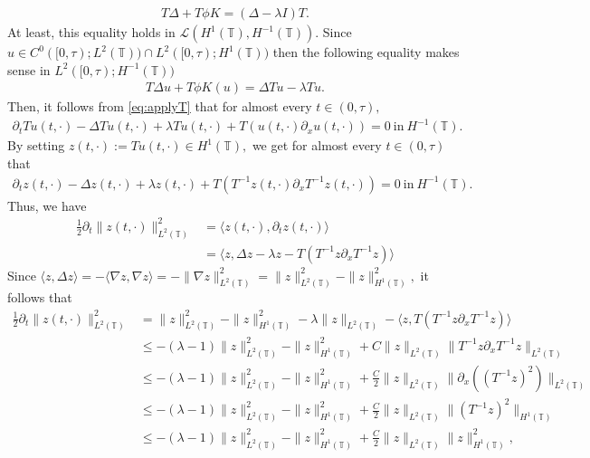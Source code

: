 \documentclass[11pt, dvipsnames]{amsart}
\begin{document}
\begin{align*}
    T\Delta +T\phi K=(\Delta-\lambda I)T.
\end{align*} 
At least, this equality holds in $\mathcal{L}(H^{1}(\mathbb{T}), H^{-1}(\mathbb{T})).$ Since $u\in C^0([0,\tau); L^2(\mathbb{T}))\cap L^{2}([0,\tau);H^{1}(\mathbb{T}))$ 
then the following equality makes sense in $L^{2}([0,\tau);H^{-1}(\mathbb{T}))$
\begin{align*}
    T\Delta u+T\phi K(u)=\Delta Tu -\lambda Tu.
\end{align*} Then, it follows from \eqref{eq:applyT} that for almost every $t\in (0,\tau),$
\begin{align*}
    \partial_t Tu(t,\cdot)-\Delta Tu(t,\cdot) +\lambda Tu(t,\cdot)+T(u(t,\cdot)\partial_x u(t,\cdot))=0\ \text{in}\  H^{-1}(\mathbb{T}).
\end{align*} By setting $z(t,\cdot):=Tu(t,\cdot)\in H^1(\mathbb{T}),$ we get for almost every $t\in (0,\tau)$ that
\begin{align*}
    \partial_t z(t,\cdot)-\Delta z(t,\cdot) +\lambda z(t,\cdot)+T(T^{-1}z(t,\cdot)\partial_x T^{-1}z(t,\cdot))=0\ \text{in}\  H^{-1}(\mathbb{T}).
\end{align*}
Thus, we have
\begin{align*}
    \frac{1}{2}\partial_t \|z(t,\cdot)\|^2_{L^2(\mathbb{T})}&=\langle z(t, \cdot), \partial_t z(t,\cdot)\rangle\\
    &=\langle z, \Delta z -\lambda z-T(T^{-1}z\partial_x T^{-1}z)\rangle
\end{align*}
Since $\langle z, \Delta z\rangle=-\langle \nabla z, \nabla z\rangle=-\|\nabla z\|^2_{L^2(\mathbb{T})}=\|z\|^2_{L^2(\mathbb{T})}-\|z\|^2_{H^1(\mathbb{T})},$ it follows that
\begin{align*}
\frac{1}{2}\partial_t \|z(t,\cdot)\|^2_{L^2(\mathbb{T})}&= \|z\|^2_{L^2(\mathbb{T})}-\|z\|^2_{H^1(\mathbb{T})}-\lambda\|z\|_{L^2(\mathbb{T})}-\langle z, T(T^{-1}z\partial_x T^{-1}z)\rangle   \\
&\leq -(\lambda-1)\|z\|^2_{L^2(\mathbb{T})}-\|z\|^2_{H^1(\mathbb{T})}+C\|z\|_{L^2(\mathbb{T})}\|T^{-1}z\partial_x T^{-1}z\|_{L^2(\mathbb{T})}\\
& \leq -(\lambda-1)\|z\|^2_{L^2(\mathbb{T})}-\|z\|^2_{H^1(\mathbb{T})}+\frac{C}{2}\|z\|_{L^2(\mathbb{T})}\|\partial_x ((T^{-1}z)^2)\|_{L^2(\mathbb{T})}\\
&\leq -(\lambda-1)\|z\|^2_{L^2(\mathbb{T})}-\|z\|^2_{H^1(\mathbb{T})}+\frac{C}{2}\|z\|_{L^2(\mathbb{T})}\| (T^{-1}z)^2\|_{H^1(\mathbb{T})}\\
&\leq -(\lambda-1)\|z\|^2_{L^2(\mathbb{T})}-\|z\|^2_{H^1(\mathbb{T})}+\frac{C}{2}
\|z\|_{L^2(\mathbb{T})}\|z\|^2_{H^1(\mathbb{T})},
\end{align*}
\end{document}
